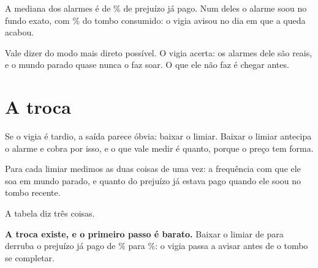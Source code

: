 A mediana dos \numVigiaAlarmesReais{} alarmes é de \numVigiaPagoMedianoPct\% de prejuízo já
pago. Num deles o alarme soou no fundo exato, com \numVigiaPagoPiorPct\% do tombo consumido:
o vigia avisou no dia em que a queda acabou.

Vale dizer do modo mais direto possível. O vigia acerta: os alarmes dele são reais, e o mundo
parado quase nunca o faz soar. O que ele não faz é chegar antes.

\section{A troca}

Se o vigia é tardio, a saída parece óbvia: baixar o limiar. Baixar o limiar antecipa o alarme
e cobra por isso, e o que vale medir é quanto, porque o preço tem forma.

Para cada limiar medimos as duas coisas de uma vez: a frequência com que ele soa em mundo
parado, e quanto do prejuízo já estava pago quando ele soou no tombo recente.

\begin{table}[htbp]
  \centering
  \caption{A troca, medida. Baixar o limiar antecipa o alarme e multiplica o falso alarme; a
    taxa de câmbio não é constante, e piora à direita da tabela.}
  \label{tab:troca}
\end{table}

A tabela diz três coisas.

\textbf{A troca existe, e o primeiro passo é barato.} Baixar o limiar de \numVigiaLimiar{}
para \numTrocaOitoLimiar{} derruba o prejuízo já pago de \numTrocaTrezePagoPct\% para
\numTrocaOitoPagoPct\%: o vigia passa a avisar antes de o tombo se completar.


